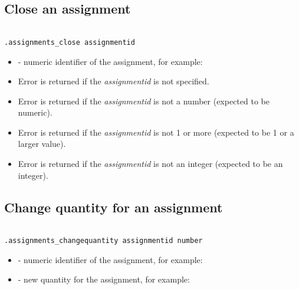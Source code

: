 \subsection{Close an assignment}

\begin{lstlisting}[style=CommandLineStyle, showlines=true]

.assignments_close assignmentid

\end{lstlisting}

\paramsheader
\begin{itemize}

    \item {} - numeric identifier of the assignment, for
    example:

\end{itemize}

\errheader
\begin{itemize}
    \item Error  is returned if the \textit{assignmentid} is not specified.
    \item Error  is returned if the \textit{assignmentid} is not a number (expected to be numeric).
    \item Error  is returned if the \textit{assignmentid} is not 1 or more (expected to be 1 or a larger value).
    \item Error  is returned if the \textit{assignmentid} is not an integer (expected to be an integer).
\end{itemize}



\subsection{Change quantity for an assignment}

\begin{lstlisting}[style=CommandLineStyle, showlines=true]

.assignments_changequantity assignmentid number

\end{lstlisting}

\paramsheader
\begin{itemize}

    \item {} - numeric identifier of the assignment, for
    example:

    \item {} - new quantity for the assignment, for example:

\end{itemize}

